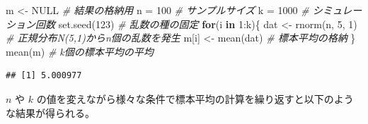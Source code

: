 \documentclass[
  ja=standard, xelatex, base=12pt]{bxjsreport}
\newenvironment{Shaded}{\begin{snugshade}}{\end{snugshade}}
\newcommand{\CommentTok}[1]{\textcolor[rgb]{0.56,0.35,0.01}{\textit{#1}}}
\newcommand{\ConstantTok}[1]{\textcolor[rgb]{0.00,0.00,0.00}{#1}}
\newcommand{\ControlFlowTok}[1]{\textcolor[rgb]{0.13,0.29,0.53}{\textbf{#1}}}
\newcommand{\DecValTok}[1]{\textcolor[rgb]{0.00,0.00,0.81}{#1}}
\newcommand{\FunctionTok}[1]{\textcolor[rgb]{0.00,0.00,0.00}{#1}}
\newcommand{\NormalTok}[1]{#1}
\newcommand{\OtherTok}[1]{\textcolor[rgb]{0.56,0.35,0.01}{#1}}
\newcommand{\SpecialCharTok}[1]{\textcolor[rgb]{0.00,0.00,0.00}{#1}}
\begin{document}
\begin{Shaded}
\begin{Highlighting}[]
\NormalTok{m }\OtherTok{\textless{}{-}} \ConstantTok{NULL} \CommentTok{\# 結果の格納用}
\NormalTok{n }\OtherTok{=} \DecValTok{100}   \CommentTok{\# サンプルサイズ}
\NormalTok{k }\OtherTok{=} \DecValTok{1000}  \CommentTok{\# シミュレーション回数}
\FunctionTok{set.seed}\NormalTok{(}\DecValTok{123}\NormalTok{) }\CommentTok{\# 乱数の種の固定}
\ControlFlowTok{for}\NormalTok{(i }\ControlFlowTok{in} \DecValTok{1}\SpecialCharTok{:}\NormalTok{k)\{}
\NormalTok{  dat }\OtherTok{\textless{}{-}} \FunctionTok{rnorm}\NormalTok{(n, }\DecValTok{5}\NormalTok{, }\DecValTok{1}\NormalTok{) }\CommentTok{\# 正規分布N(5,1)からn個の乱数を発生}
\NormalTok{  m[i] }\OtherTok{\textless{}{-}} \FunctionTok{mean}\NormalTok{(dat)     }\CommentTok{\# 標本平均の格納}
\NormalTok{\}}
\FunctionTok{mean}\NormalTok{(m)   }\CommentTok{\# k個の標本平均の平均}
\end{Highlighting}
\end{Shaded}

\begin{verbatim}
## [1] 5.000977
\end{verbatim}

\(n\) や \(k\) の値を変えながら様々な条件で標本平均の計算を繰り返すと以下のような結果が得られる。
\end{document}
